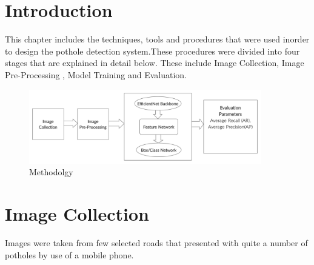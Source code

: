 \documentclass[12pt]{report}
\begin{document}
\section{Introduction}

This chapter includes the techniques, tools and procedures that were used inorder to design the pothole detection system.These procedures were divided into four stages that are explained in detail below. These include  Image Collection, Image Pre-Processing , Model Training and Evaluation.

\begin{figure}[h!]\includegraphics[width=0.9\textwidth]{Methodology (2).png}\caption{Methodolgy} \label{fig:methodology} \end{figure}%

\section{Image Collection}

Images were taken from  few selected roads that presented with quite a number of potholes by use of a mobile phone.
\end{document}
